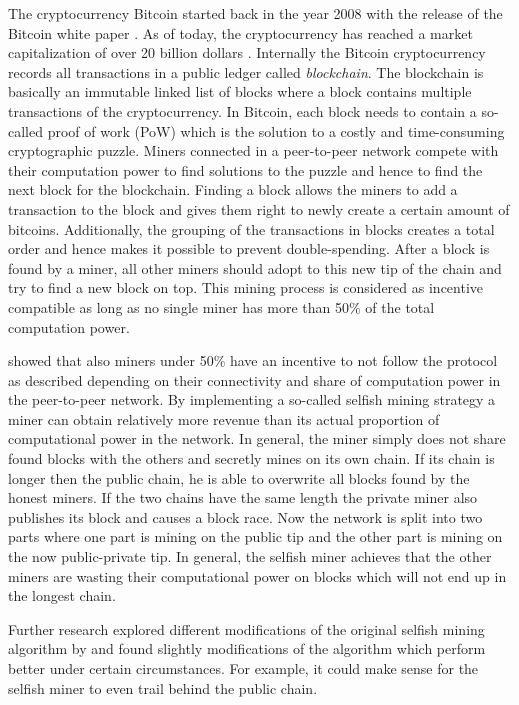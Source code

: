 The cryptocurrency Bitcoin started back in the year 2008 with the release of the Bitcoin white paper \cite{nakamoto2008bitcoin}.
As of today, the cryptocurrency has reached a market capitalization of over 20 billion dollars \cite{marketcap2017}.
Internally the Bitcoin cryptocurrency records all transactions in a public ledger called \emph{blockchain}.
The blockchain is basically an immutable linked list of blocks where a block contains multiple transactions of the cryptocurrency.
In Bitcoin, each block needs to contain a so-called proof of work (PoW) which is the solution to a costly and time-consuming cryptographic puzzle.
Miners connected in a peer-to-peer network compete with their computation power to find solutions to the puzzle and hence to find the next block for the blockchain.
Finding a block allows the miners to add a transaction to the block and gives them right to newly create a certain amount of bitcoins.
Additionally, the grouping of the transactions in blocks creates a total order and hence makes it possible to prevent double-spending.
After a block is found by a miner, all other miners should adopt to this new tip of the chain and try to find a new block on top.
This mining process is considered as incentive compatible as long as no single miner has more than 50\% of the total computation power.

\cite{eyal2014majority} showed that also miners under 50\% have an incentive to not follow the protocol as described depending on their connectivity and share of computation power in the peer-to-peer network.
By implementing a so-called selfish mining strategy a miner can obtain relatively more revenue than its actual proportion of computational power in the network.
In general, the miner simply does not share found blocks with the others and secretly mines on its own chain.
If its chain is longer then the public chain, he is able to overwrite all blocks found by the honest miners.
If the two chains have the same length the private miner also publishes its block and causes a block race.
Now the network is split into two parts where one part is mining on the public tip and the other part is mining on the now public-private tip.
In general, the selfish miner achieves that the other miners are wasting their computational power on blocks which will not end up in the longest chain.

Further research \cite{nayak2016stubborn,sapirshtein2016optimal, gervais2015tampering, gervais2016security, bahack2013theoretical} explored different modifications of the original selfish mining algorithm by \cite{eyal2014majority} and found slightly modifications of the algorithm which perform better under certain circumstances.
For example, it could make sense for the selfish miner to even trail behind the public chain.

